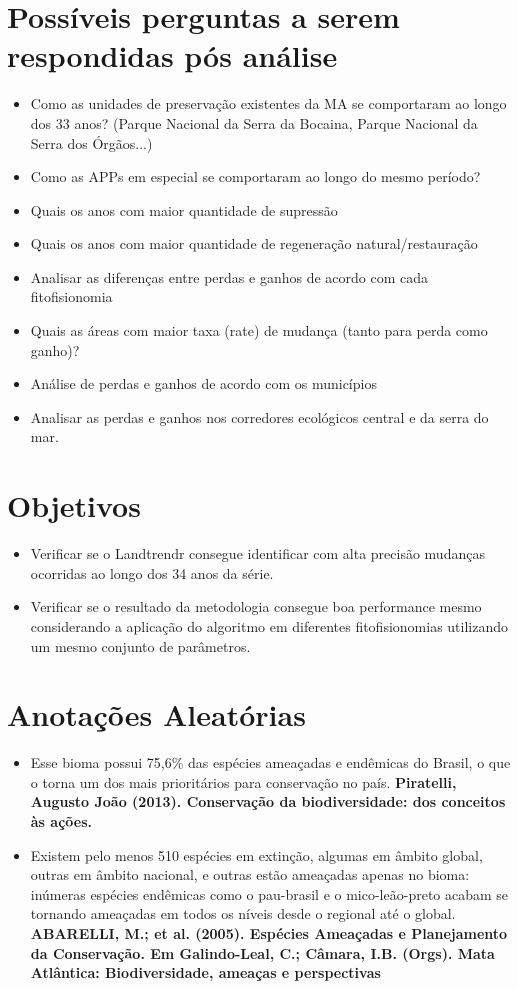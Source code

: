 \documentclass{article}
\begin{document}
\section{Possíveis perguntas a serem respondidas pós análise}
\begin{itemize}
    \item Como as unidades de preservação existentes da MA se comportaram ao longo dos 33 anos? (Parque Nacional da Serra da Bocaina, Parque Nacional da Serra dos Órgãos...)
    \item Como as APPs em especial se comportaram ao longo do mesmo período?
    \item Quais os anos com maior quantidade de supressão
    \item Quais os anos com maior quantidade de regeneração natural/restauração
    \item Analisar as diferenças entre perdas e ganhos de acordo com cada fitofisionomia
    \item Quais as áreas com maior taxa (rate) de mudança (tanto para perda como ganho)? 
    \item Análise de perdas e ganhos de acordo com os municípios
    \item Analisar as perdas e ganhos nos corredores ecológicos central e da serra do mar. 
\end{itemize}

\section{Objetivos}
\begin{itemize}
    \item Verificar se o Landtrendr consegue identificar com alta precisão mudanças ocorridas ao longo dos 34 anos da série.
    
    \item Verificar se o resultado da metodologia consegue boa performance mesmo considerando a aplicação do algoritmo em diferentes fitofisionomias utilizando um mesmo conjunto de parâmetros.
\end{itemize}

\section{Anotações Aleatórias}
\begin{itemize}
    \item Esse bioma possui 75,6\% das espécies ameaçadas e endêmicas do Brasil, o que o torna um dos mais prioritários para conservação no país. \textbf{Piratelli, Augusto João (2013). Conservação da biodiversidade: dos conceitos às ações.}
    \item Existem pelo menos 510 espécies em extinção, algumas em âmbito global, outras em âmbito nacional, e outras estão ameaçadas apenas no bioma: inúmeras espécies endêmicas como o pau-brasil e o mico-leão-preto acabam se tornando ameaçadas em todos os níveis desde o regional até o global. \textbf{ABARELLI, M.; et al. (2005). Espécies Ameaçadas e Planejamento da Conservação. Em Galindo-Leal, C.; Câmara, I.B. (Orgs). Mata Atlântica: Biodiversidade, ameaças e perspectivas}
\end{itemize}
\end{document}

